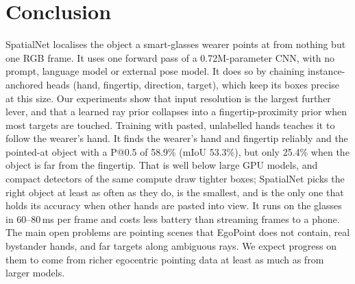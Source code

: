 \section{Conclusion}\label{sec:conclusion}
SpatialNet localises the object a smart-glasses wearer points at from nothing but one RGB frame. It uses one forward pass of a 0.72M-parameter CNN, with no prompt, language model or external pose model. It does so by chaining instance-anchored heads (hand, fingertip, direction, target), which keep its boxes precise at this size. Our experiments show that input resolution is the largest further lever, and that a learned ray prior collapses into a fingertip-proximity prior when most targets are touched. Training with pasted, unlabelled hands teaches it to follow the wearer's hand. It finds the wearer's hand and fingertip reliably and the pointed-at object with a P@0.5 of 58.9\% (mIoU 53.3\%), but only 25.4\% when the object is far from the fingertip. That is well below large GPU models, and compact detectors of the same compute draw tighter boxes; SpatialNet picks the right object at least as often as they do, is the smallest, and is the only one that holds its accuracy when other hands are pasted into view. It runs on the glasses in 60--80\,ms per frame and costs less battery than streaming frames to a phone. The main open problems are pointing scenes that EgoPoint does not contain, real bystander hands, and far targets along ambiguous rays. We expect progress on them to come from richer egocentric pointing data at least as much as from larger models.
